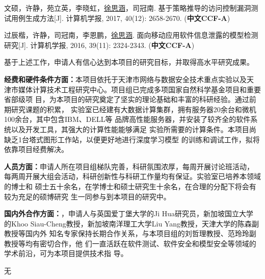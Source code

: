 \documentclass[a4paper,zihao=-4]{article}
\begin{document}
\begin{enumerate}[label={[\arabic*]}]
	\item 文硕，许静，苑立英，李晓虹，\underline{徐思涵}，司冠南. 基于策略推导的访问控制漏洞测试用例生成方法[J].
	计算机学报, 2017, 40(12): 2658-2670. (\textbf{中文CCF-A})

	\item 过辰楷，许静，司冠南，李恩鹏，\underline{徐思涵}. 面向移动应用软件信息泄露的模型检测研究[J].
	计算机学报, 2016, 39(11): 2324-2343. (\textbf{中文CCF-A})


\end{enumerate}


基于上述工作，申请人有信心达到本项目的研究目标，并取得高水平研究成果。


\textbf{经费和硬件条件方面：}本项目依托于天津市网络与数据安全技术重点实验以及天
津市媒体计算技术工程研究中心。项目组已完成多项国家自然科学基金项目和重要省部级项
目，为本项目的研究奠定了坚实的理论基础和丰富的科研经验。通过前期研究课题的积累，
实验室已经建有大数据计算集群，拥有服务器20余台和微机100余台，其中包含IBM、DELL等
品牌高性能服务器，并安装了较齐全的软件系统以及开发工具，其强大的计算性能能够满足
实验所需要的计算条件。本项目尚缺乏1台塔式图形工作站，以便更好地进行深度学习模型
的训练和调试工作，拟将依靠项目经费解决。

\textbf{人员方面：}申请人所在项目组梯队完善，科研氛围浓厚，每周开展讨论班活动，
每两周开展大组会活动，科研创新性与科研工作量均有保证。实验室已培养本领域的博士和
硕士五十余名，在学博士和硕士研究生十余名，在合理的分配下将会有较为充足的硕博研究
生一同参与到本项目的研究中。

\textbf{国内外合作方面：}，申请人与英国爱丁堡大学的Ji Hua研究员，新加坡国立大学
的Khoo Siau-Cheng教授，新加坡南洋理工大学Liu Yang教授，天津大学的陈森副教授等国内外
知名专家保持长期合作关系，与本项目组的刘哲理教授、范玲玲副教授等均有密切合作，他
们一直活跃在软件测试、软件安全和模型安全等领域的学术前沿，可为本项目提供技术指
导。


无

\end{document}
